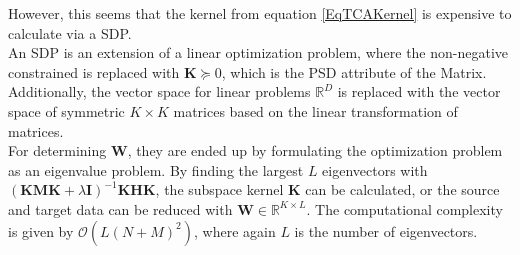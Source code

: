 However, this seems that the kernel from equation \eqref{EqTCAKernel} is expensive to calculate via a \ac{SDP}.\cite{Pan.2011}\\
An \acs{SDP} is an extension of a linear optimization problem, where the non-negative constrained is replaced with $\mathbf{K}\succeq 0$, which is the \acs{PSD} attribute of the Matrix. Additionally, the vector space for linear problems $\mathbb{R}^D$ is replaced with the vector space of symmetric $K\times K$ matrices based on the linear transformation of matrices.\cite{Gartner.2012}\\
For determining $\mathbf{W}$, they are ended up by formulating the optimization problem as an eigenvalue problem.
By finding the largest $L$ eigenvectors with $(\mathbf{KMK}+\lambda \mathbf{I})^{-1} \mathbf{KHK}$, the subspace kernel $\mathbf{K}$ can be calculated, or the source and target data can be reduced with $\mathbf{W} \in \mathbb{R}^{K\times L}$.
The computational complexity is given by $\mathcal{O}(L(N+M)^2)$, where again $L$ is the number of eigenvectors.\cite{Pan.2011}
